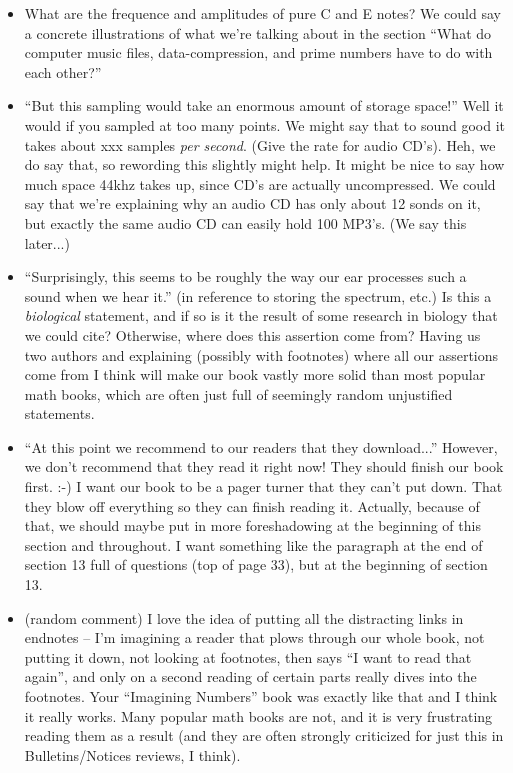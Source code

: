 \documentclass{article}
\begin{document}
\begin{itemize}
\item What are the frequence and amplitudes of pure C and E notes?
We could say a concrete illustrations of what we're talking about 
in the section ``What do computer music ﬁles, data-compression, and prime 
numbers have to do with each other?''

\item ``But this sampling would take an enormous amount of storage
  space!''  Well it would if you sampled at too many points.  We might
  say that to sound good it takes about xxx samples {\em per second}.
  (Give the rate for audio CD's).  Heh, we do say that, so rewording
  this slightly might help.  It might be nice to say how much space
  44khz takes up, since CD's are actually uncompressed.  We could say
  that we're explaining why an audio CD has only about 12 sonds on it,
  but exactly the same audio CD can easily hold 100 MP3's.  (We say
  this later...)

\item ``Surprisingly, this seems to be roughly the way our ear
  processes such a sound when we hear it.'' (in reference to storing
  the spectrum, etc.)  Is this a {\em biological} statement, and if so
  is it the result of some research in biology that we could cite?
  Otherwise, where does this assertion come from?  Having us two
  authors and explaining (possibly with footnotes) where all our
  assertions come from I think will make our book vastly more solid
  than most popular math books, which are often just full of seemingly
  random unjustified statements.

\item ``At this point we recommend to our readers that they
  download...'' However, we don't recommend that they read it right
  now!  They should finish our book first. :-) I want our book to be a
  pager turner that they can't put down.  That they blow off
  everything so they can finish reading it.  Actually, because of
  that, we should maybe put in more foreshadowing at the beginning of
  this section and throughout.  I want something like the paragraph at
  the end of section 13 full of questions (top of page 33), but at the
  beginning of section 13.

\item (random comment) I love the idea of putting all the distracting
  links in endnotes -- I'm imagining a reader that plows through our
  whole book, not putting it down, not looking at footnotes, then says
  ``I want to read that again'', and only on a second reading of
  certain parts really dives into the footnotes.  Your ``Imagining
  Numbers'' book was exactly like that and I think it really works.
  Many popular math books are not, and it is very frustrating reading
  them as a result (and they are often strongly criticized for just
  this in Bulletins/Notices reviews, I think).


\end{itemize}
\end{document}
